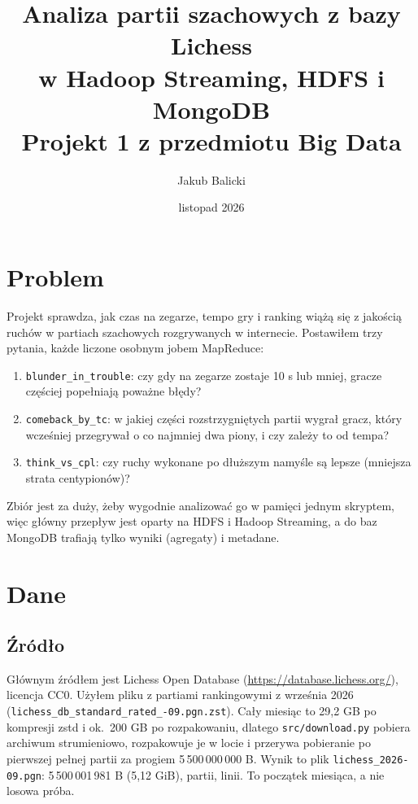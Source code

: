 \documentclass[11pt,a4paper]{article}
\title{Analiza partii szachowych z bazy Lichess\\
       w Hadoop Streaming, HDFS i MongoDB\\[0.4em]
       \large Projekt 1 z przedmiotu Big Data}
\author{Jakub Balicki}
\date{listopad 2026}
\newcommand{\kod}[1]{\texttt{#1}}
\begin{document}
\maketitle
\tableofcontents

\section{Problem}
Projekt sprawdza, jak czas na zegarze, tempo gry i ranking wiążą się z jakością ruchów w partiach szachowych rozgrywanych w internecie. Postawiłem trzy pytania, każde liczone osobnym jobem MapReduce:
\begin{enumerate}
\item \kod{blunder\_in\_trouble}: czy gdy na zegarze zostaje 10 s lub mniej, gracze częściej popełniają poważne błędy?
\item \kod{comeback\_by\_tc}: w jakiej części rozstrzygniętych partii wygrał gracz, który wcześniej przegrywał o co najmniej dwa piony, i czy zależy to od tempa?
\item \kod{think\_vs\_cpl}: czy ruchy wykonane po dłuższym namyśle są lepsze (mniejsza strata centypionów)?
\end{enumerate}
Zbiór jest za duży, żeby wygodnie analizować go w pamięci jednym skryptem, więc główny przepływ jest oparty na HDFS i Hadoop Streaming, a do baz MongoDB trafiają tylko wyniki (agregaty) i metadane.

\section{Dane}
\subsection{Źródło}
Głównym źródłem jest Lichess Open Database (\url{https://database.lichess.org/}), licencja CC0. Użyłem pliku z partiami rankingowymi z września 2026 (\kod{lichess\_db\_standard\_rated\_-09.pgn.zst}). Cały miesiąc to 29,2 GB po kompresji zstd i ok.\ 200 GB po rozpakowaniu, dlatego \kod{src/download.py} pobiera archiwum strumieniowo, rozpakowuje je w locie i przerywa pobieranie po pierwszej pełnej partii za progiem 5\,500\,000\,000 B. Wynik to plik \kod{lichess\_2026-09.pgn}: 5\,500\,001\,981 B (5,12 GiB), \nGames{} partii, \nMapInput{} linii. To początek miesiąca, a nie losowa próba.
\end{document}
